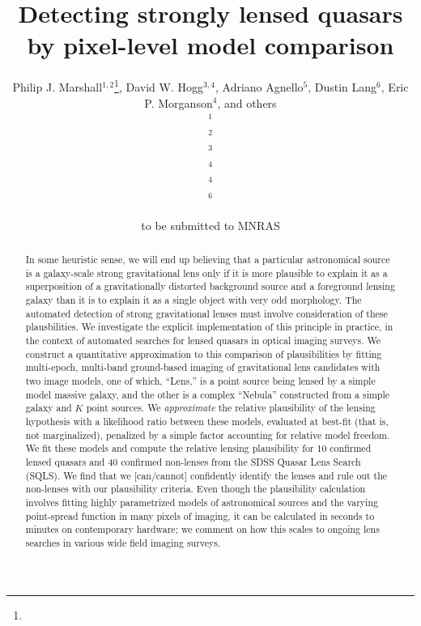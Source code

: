 \documentclass[useAMS,usenatbib]{mn2e}
\title[Finding lensed quasars]
{Detecting strongly lensed quasars by pixel-level model comparison}
\author[]{%
  Philip J. Marshall$^{1,2}$\thanks{\pjmemail},
  David W. Hogg$^{3,4}$,
  Adriano Agnello$^{5}$,
  Dustin Lang$^{6}$,
  Eric P. Morganson$^{4}$,
  and others 
  \medskip\\
  $^1$\kipac\\
  $^2$\oxford\\
  $^3$\nyu\\
  $^4$\mpia\\
  $^4$\ucsb\\
  $^6$\cmu
}
\begin{document}
             
\date{to be submitted to MNRAS}
             
\pagerange{\pageref{firstpage}--\pageref{lastpage}}

\maketitle           

\label{firstpage}


\begin{abstract}
In some heuristic sense, we will end up believing that a particular
astronomical source is a galaxy-scale strong gravitational lens only if it
is more plausible to explain it as a superposition of a gravitationally
distorted background source and a foreground lensing galaxy than it is to
explain it as a single object with very odd morphology. The automated
detection of strong gravitational lenses must involve consideration of
these plausbilities.
%
We investigate the explicit implementation of this principle in practice,
in the context of automated searches for lensed quasars in optical imaging
surveys. We construct a quantitative approximation to this comparison of
plausibilities by fitting multi-epoch, multi-band ground-based imaging of
gravitational lens candidates with two image models, one of which,
``Lens,'' is a point source being lensed by a simple model massive galaxy,
and the other is a complex ``Nebula'' constructed from a simple galaxy and
$K$ point sources.  We \emph{approximate} the relative plausibility of the
lensing hypothesis with a likelihood ratio between these models, evaluated
at best-fit (that is, not marginalized), penalized by a simple factor
accounting for relative model freedom.
%
We fit these models and compute the relative lensing plausibility for 10
confirmed lensed quasars and 40 confirmed non-lenses from the SDSS Quasar
Lens Search (SQLS).  We find that we [can/cannot] confidently identify the
lenses and rule out the non-lenses with our plausibility criteria.  Even
though the plausibility calculation involves fitting highly parametrized
models of astronomical sources and the varying point-spread function in
many pixels of imaging, it can be calculated in seconds to minutes on
contemporary hardware; we comment on how this scales to ongoing lens
searches in various wide field imaging surveys.
\end{abstract}
\end{document}
